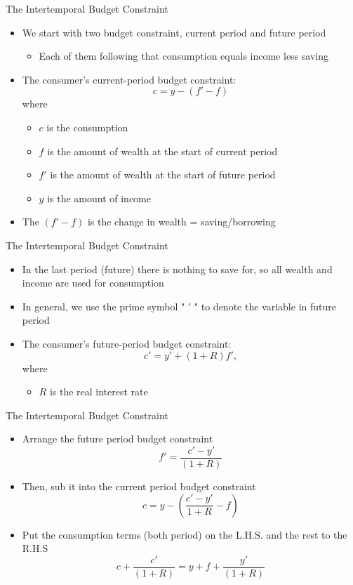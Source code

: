 \documentclass[aspectratio=1610]{beamer}
\begin{document}
\begin{frame}[wide]{The Intertemporal Budget Constraint}
	
	\begin{itemize}
		\item We start with two budget constraint, current period and future period
		\vspace{1mm}
		\begin{itemize}
			\item Each of them following that consumption equals income less saving
		\end{itemize}
		\item The consumer’s current-period budget constraint:
		\[c = y - (f'-f)\]
		where 
		\begin{itemize}
			\item[] $c$ is the consumption
			\item[] $f$ is the amount of wealth at the start of current period
			\item[] $f'$ is the amount of wealth at the start of future period
			\item[] $y$ is the amount of income
		\end{itemize}
		\item The $(f'-f)$ is the change in wealth = saving/borrowing
	\end{itemize}
\end{frame}

\begin{frame}[wide]{The Intertemporal Budget Constraint}
	\begin{itemize}
		\item In the last period (future) there is nothing to save for, so all wealth and income are used for consumption
		\item In general, we use the prime symbol " $'$ " to denote the variable in future period 
		\item The consumer’s future-period budget constraint:
		\[c' = y'  + (1+R)f',\]
		where 
		\begin{itemize}
			\item[] $R$ is the real interest rate
		\end{itemize}
	\end{itemize}
\end{frame}

\begin{frame}[wide]{The Intertemporal Budget Constraint}
	\begin{itemize}
		\item Arrange the future period budget constraint
		\[f' = \frac{c'-y'}{(1+R)}\]
		\item Then, sub it into the current period budget constraint
		\[c = y - \left(\frac{c'-y'}{1+R}-f\right)\]
		\item Put the consumption terms (both period) on the L.H.S. and the rest to the R.H.S
		\[c+\frac{c'}{(1+R)}  = y +f + \frac{y'}{(1+R)}\]
	\end{itemize}
\end{frame}
\end{document}
